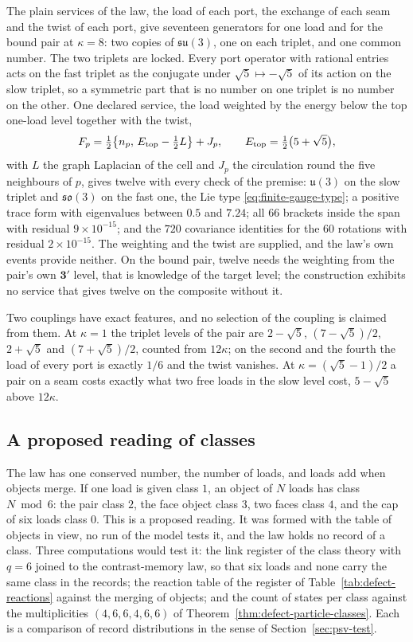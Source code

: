 The plain services of the law, the load of each port, the exchange of each seam and the
twist of each port, give seventeen generators for one load and for the bound pair at
$\kappa=8$: two copies of $\mathfrak{su}(3)$, one on each triplet, and one common number.
The two triplets are locked. Every port operator with rational entries acts on the fast
triplet as the conjugate under $\sqrt5\mapsto-\sqrt5$ of its action on the slow triplet,
so a symmetric part that is no number on one triplet is no number on the other. One
declared service, the load weighted by the energy below the top one-load level together
with the twist,
\[
 F_p=\tfrac12\bigl\{n_p,\,E_{\rm top}-\tfrac12L\bigr\}+J_p,\qquad
 E_{\rm top}=\tfrac12\bigl(5+\sqrt5\bigr),
\]
with $L$ the graph Laplacian of the cell and $J_p$ the circulation round the five
neighbours of $p$, gives twelve with every
check of the premise: $\mathfrak u(3)$ on the slow triplet and $\mathfrak{so}(3)$ on the
fast one, the Lie type \eqref{eq:finite-gauge-type}; a positive trace form with
eigenvalues between $0.5$ and $7.24$; all $66$ brackets inside the span with residual
$9\times10^{-15}$; and the $720$ covariance identities for the $60$ rotations with
residual $2\times10^{-15}$. The weighting and the twist are supplied, and the law's own
events provide neither. On the bound pair, twelve needs the weighting from the pair's own
$\mathbf3'$ level, that is knowledge of the target level; the construction exhibits no
service that gives twelve on the composite without it.

Two couplings have exact features, and no selection of the coupling is claimed from
them. At $\kappa=1$ the triplet levels of the pair are $2-\sqrt5$, $(7-\sqrt5)/2$,
$2+\sqrt5$ and $(7+\sqrt5)/2$, counted from $12\kappa$; on the second and the fourth the
load of every port is exactly $1/6$ and the twist vanishes. At $\kappa=(\sqrt5-1)/2$ a pair
on a seam costs exactly what two free loads in the slow level cost, $5-\sqrt5$ above
$12\kappa$.

\subsection{A proposed reading of classes}
\label{sec:psv-class-reading}

The law has one conserved number, the number of loads, and loads add when objects merge.
If one load is given class $1$, an object of $N$ loads has class
$N\bmod 6$: the pair class $2$, the face object class $3$, two faces class $4$, and the cap
of six loads class $0$. This is a proposed reading. It was formed with the table of
objects in view, no run of the model tests it, and the law holds no record of a class.
Three computations would test it: the link register of the class theory with $q=6$ joined
to the contrast-memory law, so that six loads and none carry the same class in the
records; the reaction table of the register of
Table~\ref{tab:defect-reactions} against the merging of objects; and the count of states
per class against the multiplicities $(4,6,6,4,6,6)$ of
Theorem~\ref{thm:defect-particle-classes}. Each is a comparison of record distributions in
the sense of Section~\ref{sec:psv-test}.

